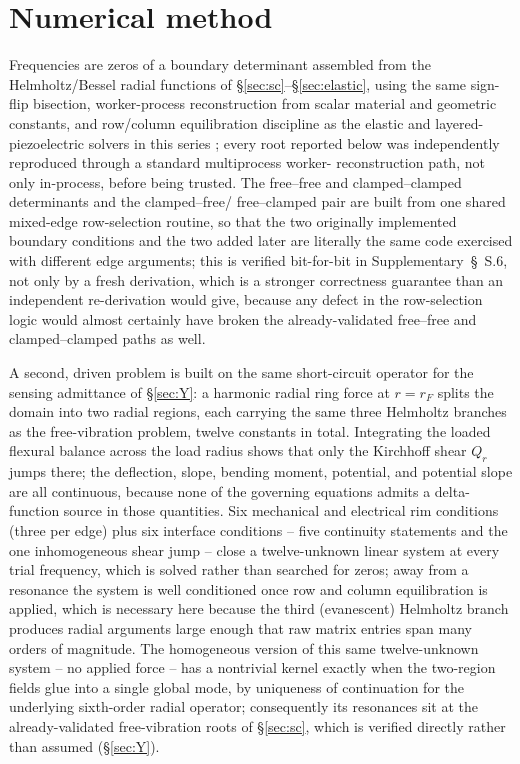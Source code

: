 \documentclass[11pt]{article}
\begin{document}
\section{Numerical method}\label{sec:method}
Frequencies are zeros of a boundary determinant assembled from the
Helmholtz/Bessel radial functions of \S\ref{sec:sc}--\S\ref{sec:elastic},
using the same sign-flip bisection, worker-process reconstruction from
scalar material and geometric constants, and row/column equilibration
discipline as the elastic and layered-piezoelectric solvers in this
series \cite{mccune2026ring,mccune2026piezo}; every root reported below
was independently reproduced through a standard multiprocess worker-%
reconstruction path, not only in-process, before being trusted. The
free--free and clamped--clamped determinants and the clamped--free/
free--clamped pair are built from one shared mixed-edge row-selection
routine, so that the two originally implemented boundary conditions and
the two added later are literally the same code exercised with different
edge arguments; this is verified bit-for-bit in
Supplementary~\S~S.6, not only by a fresh derivation, which is a
stronger correctness guarantee than an independent re-derivation would
give, because any defect in the row-selection logic would almost
certainly have broken the already-validated free--free and
clamped--clamped paths as well.

A second, driven problem is built on the same short-circuit operator for
the sensing admittance of \S\ref{sec:Y}: a harmonic radial ring force at
$r=r_F$ splits the domain into two radial regions, each carrying the same
three Helmholtz branches as the free-vibration problem, twelve constants
in total. Integrating the loaded flexural balance across the load radius
shows that only the Kirchhoff shear $Q_r$ jumps there; the deflection,
slope, bending moment, potential, and potential slope are all continuous,
because none of the governing equations admits a delta-function source in
those quantities. Six mechanical and electrical rim conditions (three per
edge) plus six interface conditions -- five continuity statements and the
one inhomogeneous shear jump -- close a twelve-unknown linear system at
every trial frequency, which is solved rather than searched for zeros;
away from a resonance the system is well conditioned once row and column
equilibration is applied, which is necessary here because the third
(evanescent) Helmholtz branch produces radial arguments large enough that
raw matrix entries span many orders of magnitude. The homogeneous version
of this same twelve-unknown system -- no applied force -- has a nontrivial
kernel exactly when the two-region fields glue into a single global mode,
by uniqueness of continuation for the underlying sixth-order radial
operator; consequently its resonances sit at the already-validated
free-vibration roots of \S\ref{sec:sc}, which is verified directly rather
than assumed (\S\ref{sec:Y}).
\end{document}
